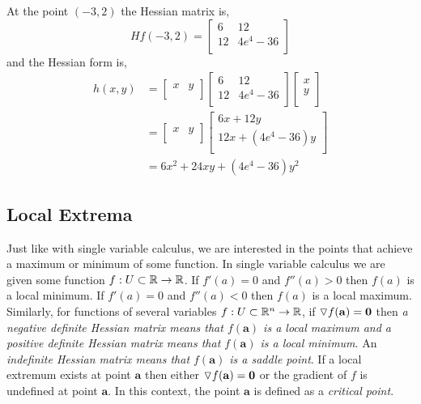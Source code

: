 \documentclass[12pt]{article}
\begin{document}
 At the point $(-3,2)$ the Hessian matrix is,
\[
Hf(-3,2) = 
\begin{bmatrix}
6 & 12 \\
12 & 4e^{4}-36  \\
\end{bmatrix}
\]
and the Hessian form is,
\begin{align*}
h(x,y) &= 
\begin{bmatrix}
x & y \\
\end{bmatrix}
\begin{bmatrix}
6 & 12 \\
12 & 4e^{4}-36  \\
\end{bmatrix}
\begin{bmatrix}
x \\
y \\
\end{bmatrix} \\
&= 
\begin{bmatrix}
x & y \\
\end{bmatrix}
\begin{bmatrix}
6x + 12y \\
12x + (4e^{4}-36)y  \\
\end{bmatrix} \\
&=
6x^2 + 24xy +  (4e^{4}-36)y^2
\end{align*}

\subsection{Local Extrema}

 Just like with single variable calculus, we are interested in the points that achieve a maximum or minimum of some function. In single variable calculus we are given some function $f:U\subset\mathbb{R}\rightarrow\mathbb{R}$. If $f'(a)=0$ and $f''(a)>0$ then $f(a)$ is a local minimum. If $f'(a)=0$ and $f''(a)<0$ then $f(a)$ is a local maximum. \\

 Similarly, for functions of several variables $f:U\subset\mathbb{R}^n\rightarrow\mathbb{R}$, if $\triangledown f(\mathbf{a})=\mathbf{0}$ then \emph{a negative definite Hessian matrix means that $f(\mathbf{a})$ is a local maximum and a positive definite Hessian matrix means that $f(\mathbf{a})$ is a local minimum}. An \emph{indefinite Hessian matrix means that $f(\mathbf{a})$ is a saddle point}. If a local extremum exists at point $\mathbf{a}$ then either $\triangledown f(\mathbf{a})=\mathbf{0}$ or the gradient of $f$ is undefined at point $\mathbf{a}$. In this context, the point $\mathbf{a}$ is defined as a \emph{critical point}.  \\
\end{document}
